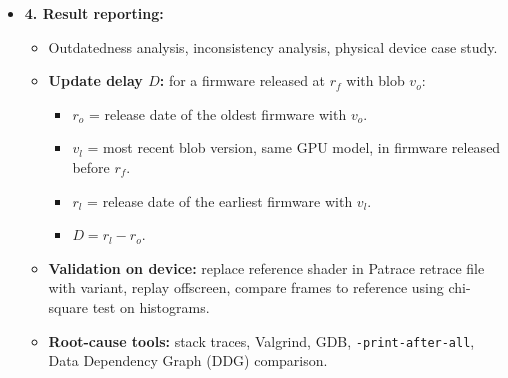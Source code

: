 \documentclass[11pt,a4paper]{article}
\begin{document}
\begin{enumerate}
\begin{itemize}[leftmargin=*, itemsep=1pt, topsep=2pt]
\begin{itemize}[itemsep=0pt]
\begin{itemize}[itemsep=0pt]
            \end{itemize}
        \end{itemize}
        \item \textbf{4. Result reporting:}
        \begin{itemize}[itemsep=0pt]
            \item Outdatedness analysis, inconsistency analysis, physical device case study.
            \item \textbf{Update delay $D$:} for a firmware released at $r_f$ with blob $v_o$:
            \begin{itemize}[itemsep=0pt]
                \item $r_o$ = release date of the oldest firmware with $v_o$.
                \item $v_l$ = most recent blob version, same GPU model, in firmware released before $r_f$.
                \item $r_l$ = release date of the earliest firmware with $v_l$.
                \item $D = r_l - r_o$.
            \end{itemize}
            \item \textbf{Validation on device:} replace reference shader in Patrace retrace file with variant, replay offscreen, compare frames to reference using chi-square test on histograms.
            \item \textbf{Root-cause tools:} stack traces, Valgrind, GDB, \texttt{-print-after-all}, Data Dependency Graph (DDG) comparison.
        \end{itemize}
    \end{itemize}


\end{enumerate}
\end{document}
